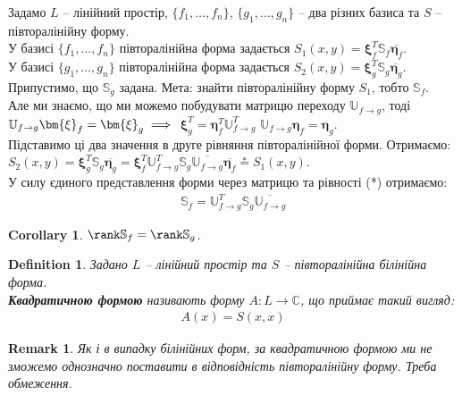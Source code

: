 \documentclass[a4paper, 10pt]{article}
\theoremstyle{theoremdd}
\newtheorem{definition}[theorem]{Definition}
\newtheorem{remark}[theorem]{Remark}
\newtheorem{corollary}[theorem]{Corollary}
\begin{document}
\noindent
Задамо $L$ -- лінійний простір, $\{f_1,\dots,f_n\}$, $\{g_1,\dots,g_n\}$ -- два різних базиса та $S$ -- півторалінійну форму.\\
У базисі $\{f_1,\dots,f_n\}$ півторалінійна форма задається $S_1(x,y) = \bm{\xi}^T_f \mathbb{S}_f \overline{\bm{\eta}_f}$.\\
У базисі $\{g_1,\dots,g_n\}$ півторалінійна форма задається $S_2(x,y) = \bm{\xi}^T_g \mathbb{S}_g \overline{\bm{\eta}_g}$.\\
Припустимо, що $\mathbb{S}_g$ задана. Мета: знайти півторалінійну форму $S_1$, тобто $\mathbb{S}_f$.\\
Але ми знаємо, що ми можемо побудувати матрицю переходу $\mathbb{U}_{f \to g}$, тоді $\mathbb{U}_{f \to g} \bm{\xi}_f = \bm{\xi}_g \implies \\ $ 
$\bm{\xi}_g^T = \bm{\eta}_f^T \mathbb{U}_{f \to g}^T$ \qquad $\mathbb{U}_{f \to g} \bm{\eta}_f = \bm{\eta}_g$.\\
Підставимо ці два значення в друге рівняння півторалінійної форми. Отримаємо:\\
$S_2(x,y) = \bm{\xi}_g^T \mathbb{S}_g \overline{\bm{\eta}_g} = \bm{\xi}_f^T \mathbb{U}^T_{f \to g} \mathbb{S}_g \overline{\mathbb{U}_{f \to g}} \overline{\bm{\eta}_f} \overset{*}{=} S_1(x,y)$.\\
У силу єдиного представлення форми через матрицю та рівності (*) отримаємо:
\begin{align*}
\mathbb{S}_f = \mathbb{U}^T_{f \to g} \mathbb{S}_g \overline{\mathbb{U}_{f \to g}}
\end{align*}

\begin{corollary}
$\rank \mathbb{S}_f = \rank \mathbb{S}_g$.
\end{corollary}

\begin{definition}
Задано $L$ -- лінійний простір та $S$ -- півторалінійна білінійна форма.\\
\textbf{Квадратичною формою} називають форму $A \colon L \to \mathbb{C}$, що приймає такий вигляд:
\begin{align*}
A(x) = S(x,x)
\end{align*}
\end{definition}

\begin{remark}
Як і в випадку білінійних форм, за квадратичною формою ми не зможемо однозначно поставити в відповідність півторалінійну форму. Треба обмеження.
\end{remark}
\end{document}

